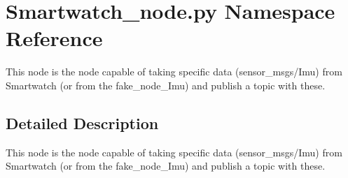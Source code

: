 \hypertarget{namespaceSmartwatch__node_1_1py}{}\section{Smartwatch\+\_\+node.\+py Namespace Reference}
\label{namespaceSmartwatch__node_1_1py}


This node is the node capable of taking specific data (sensor\+\_\+msgs/\+Imu) from Smartwatch (or from the fake\+\_\+node\+\_\+\+Imu) and publish a topic with these.  




\subsection{Detailed Description}
This node is the node capable of taking specific data (sensor\+\_\+msgs/\+Imu) from Smartwatch (or from the fake\+\_\+node\+\_\+\+Imu) and publish a topic with these. 

